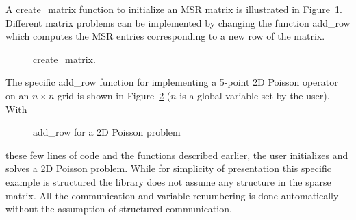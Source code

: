 A {\sf create\_matrix} function to initialize an MSR matrix is illustrated in
Figure~\ref{create_matrix}.  Different matrix problems can be implemented by
changing the function {\sf add\_row} which computes the MSR entries
corresponding to a new row of the matrix.
%
\begin{figure}[Htbp]
  \caption{{\sf create\_matrix}.}\label{create_matrix}
\end{figure}
%
The specific {\sf add\_row} function for implementing a 5-point 2D Poisson
operator on an $n \times n$ grid is shown in Figure~\ref{add_row} ($n$ is a
global variable set by the user).  With
\begin{figure}[t]
  \caption{{\sf add\_row} for a 2D Poisson problem}\label{add_row}
\end{figure}
these few lines of code and the functions described earlier, the user
initializes and solves a 2D Poisson problem. While for simplicity of
presentation this specific example is structured the \Az{} library does not
assume any structure in the sparse matrix.  All the communication and variable
renumbering is done automatically without the assumption of structured
communication.

